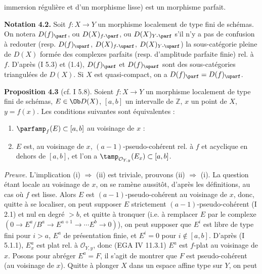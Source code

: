 immersion régulière et d'un morphisme lisse) est un morphisme parfait.

\textbf{Notation 4.2.} Soit \(f:X\to Y\) un morphisme localement de type fini de schémas. On notera \(D(f)_{\parf}\), ou \(D(X)_{f\text{-}\parf}\), ou \(D(X)_{Y\text{-}\parf}\) s'il n'y a pas de confusion à redouter (resp. \(D(f)_{\uparf}\), \(D(X)_{f\text{-}\uparf}\), \(D(X)_{Y\text{-}\uparf}\)) la sous-catégorie pleine de \(D(X)\) formée des complexes parfaits (resp. d'amplitude parfaite finie) rel. à \(f\). D'après (I 5.3) et (1.4), \(D(f)_{\parf}\) et \(D(f)_{\uparf}\) sont des sous-catégories triangulées de \(D(X)\). Si \(X\) est quasi-compact, on a \(D(f)_{\parf}=D(f)_{\uparf}\).

\textbf{Proposition 4.3} (cf. I 5.8). Soient \(f:X\to Y\) un morphisme localement de type fini de schémas, \(E\in\Ob D(X)\), \([a,b]\) un intervalle de \(\mathbb Z\), \(x\) un point de \(X\), \(y=f(x)\). Les conditions suivantes sont équivalentes :
\begin{enumerate}[label=(\roman*)]
\item \(\parfamp_f(E)\subset[a,b]\) au voisinage de \(x\) :
\item \(E\) est, au voisinage de \(x\), \((a-1)\)-pseudo-cohérent rel. à \(f\) et acyclique en dehors de \([a,b]\), et l'on a \(\tamp_{\mathcal O_{Y,y}}(E_x)\subset[a,b]\).
\end{enumerate}

\emph{Preuve.} L'implication (i) \(\Longrightarrow\) (ii) est triviale, prouvons (ii) \(\Longrightarrow\) (i). La question étant locale au voisinage de \(x\), on se ramène aussitôt, d'après les définitions, au cas où \(f\) est lisse. Alors \(E\) est \((a-1)\)-pseudo-cohérent au voisinage de \(x\), donc, quitte à se localiser, on peut supposer \(E\) strictement \((a-1)\)-pseudo-cohérent (I 2.1) et nul en degré \(>b\), et quitte à tronquer (i.e. à remplacer \(E\) par le complexe \((0\to E^a/B^a\to E^{a+1}\to\cdots E^b\to 0)\)), on peut supposer que \(E^i\) est libre de type fini pour \(i>a\), \(E^a\) de présentation finie, et \(E^i=0\) pour \(i\notin[a,b]\). D'après (I 5.1.1), \(E^a_x\) est plat rel. à \(\mathcal O_{Y,y}\), donc (EGA IV 11.3.1) \(E^a\) est \(f\)-plat au voisinage de \(x\). Posons pour abréger \(E^a=F\), il s'agit de montrer que \(F\) est pseudo-cohérent (au voisinage de \(x\)). Quitte à plonger \(X\) dans un espace affine type sur \(Y\), on peut
